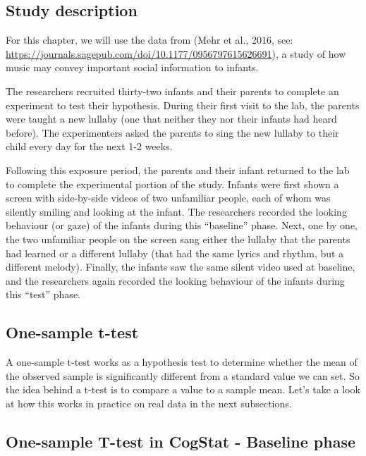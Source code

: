 \documentclass[
]{book}
\begin{document}
\hypertarget{study-description-1}{%
\subsection{Study description}\label{study-description-1}}

For this chapter, we will use the data from (Mehr et al., 2016, see: \url{https://journals.sagepub.com/doi/10.1177/0956797615626691}), a study of how music may convey important social information to infants.

The researchers recruited thirty-two infants and their parents to complete an experiment to test their hypothesis. During their first visit to the lab, the parents were taught a new lullaby (one that neither they nor their infants had heard before). The experimenters asked the parents to sing the new lullaby to their child every day for the next 1-2 weeks.

Following this exposure period, the parents and their infant returned to the lab to complete the experimental portion of the study. Infants were first shown a screen with side-by-side videos of two unfamiliar people, each of whom was silently smiling and looking at the infant. The researchers recorded the looking behaviour (or gaze) of the infants during this ``baseline'' phase. Next, one by one, the two unfamiliar people on the screen sang either the lullaby that the parents had learned or a different lullaby (that had the same lyrics and rhythm, but a different melody). Finally, the infants saw the same silent video used at baseline, and the researchers again recorded the looking behaviour of the infants during this ``test'' phase.

\hypertarget{one-sample-t-test}{%
\subsection{One-sample t-test}\label{one-sample-t-test}}

A one-sample t-test works as a hypothesis test to determine whether the mean of the observed sample is significantly different from a standard value we can set. So the idea behind a t-test is to compare a value to a sample mean. Let's take a look at how this works in practice on real data in the next subsections.

\hypertarget{one-sample-t-test-in-cogstat---baseline-phase}{%
\subsection{One-sample T-test in CogStat - Baseline phase}\label{one-sample-t-test-in-cogstat---baseline-phase}}
\end{document}
